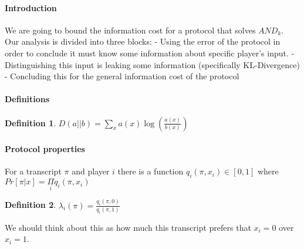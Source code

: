 \documentclass{article}
\theoremstyle{plain}
\newtheorem{definition}{Definition}
\begin{document}
\paragraph{Introduction}
We are going to bound the information cost for a protocol that solves $AND_k$. Our analysis is divided into three blocks:  - Using the error of the protocol in order to conclude it must know some information about specific player's input.  - Distinguishing this input is leaking some information (specifically KL-Divergence)  - Concluding this for the general information cost of the protocol \newline
\paragraph{Definitions}
\begin{definition}
$D(a || b) = \underset{x}{\sum}a(x)\log(\frac{a(x)}{b(x)})$
\end{definition}
\paragraph{Protocol properties}
For a transcript $\pi$ and player $i$ there is a function $q_i(\pi, x_i) \in [0,1]$ where \newline
$Pr[\pi | x] = \underset{i}{\Pi}q_i(\pi, x_i )$
\begin{definition}
$\lambda _i (\pi) = \frac{q_i(\pi, 0)}{q_i(\pi, 1)}$
\end{definition}
We should think about this as how much this transcript prefers that $x_i = 0$ over $x_i = 1$.
\end{document}
